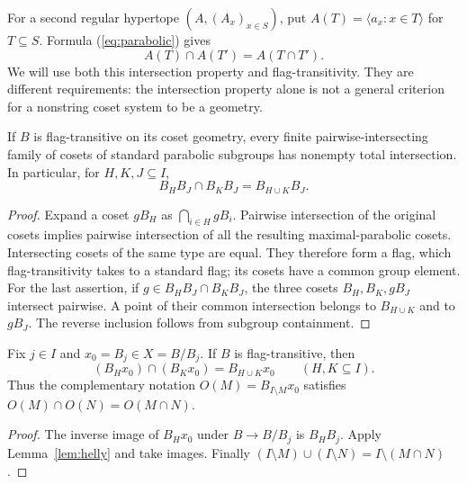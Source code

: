 For a second regular hypertope $(A,(A_x)_{x\in S})$, put $A(T)=\langle a_x:x\in T\rangle$ for $T\subseteq S$. Formula (\ref{eq:parabolic}) gives
\begin{equation}\label{eq:ip}
A(T)\cap A(T')=A(T\cap T').
\end{equation}
We will use both this intersection property and flag-transitivity. They are different requirements: the intersection property alone is not a general criterion for a nonstring coset system to be a geometry.

\begin{lemma}\label{lem:helly}
If $B$ is flag-transitive on its coset geometry, every finite pairwise-intersecting family of cosets of standard parabolic subgroups has nonempty total intersection. In particular, for $H,K,J\subseteq I$,
\[
B_HB_J\cap B_KB_J=B_{H\cup K}B_J.
\]
\end{lemma}
\begin{proof}
Expand a coset $gB_H$ as $\bigcap_{i\in H}gB_i$. Pairwise intersection of the original cosets implies pairwise intersection of all the resulting maximal-parabolic cosets. Intersecting cosets of the same type are equal. They therefore form a flag, which flag-transitivity takes to a standard flag; its cosets have a common group element. For the last assertion, if $g\in B_HB_J\cap B_KB_J$, the three cosets $B_H,B_K,gB_J$ intersect pairwise. A point of their common intersection belongs to $B_{H\cup K}$ and to $gB_J$. The reverse inclusion follows from subgroup containment.
\end{proof}

\begin{theorem}\label{thm:elements}
Fix $j\in I$ and $x_0=B_j\in X=B/B_j$. If $B$ is flag-transitive, then
\begin{equation}\label{eq:orbit}
(B_Hx_0)\cap(B_Kx_0)=B_{H\cup K}x_0\qquad(H,K\subseteq I).
\end{equation}
Thus the complementary notation $O(M)=B_{I\setminus M}x_0$ satisfies $O(M)\cap O(N)=O(M\cap N)$.
\end{theorem}
\begin{proof}
The inverse image of $B_Hx_0$ under $B\to B/B_j$ is $B_HB_j$. Apply Lemma~\ref{lem:helly} and take images. Finally $(I\setminus M)\cup(I\setminus N)=I\setminus(M\cap N)$.
\end{proof}

